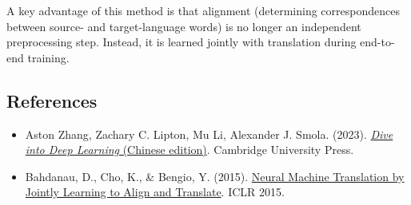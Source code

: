 A key advantage of this method is that alignment (determining correspondences between source- and target-language words) is no longer an independent preprocessing step. Instead, it is learned jointly with translation during end-to-end training.

\FloatBarrier
{}
\hypertarget{references-68}{%
\subsection{References}\label{references-68}}

\vspace{0.25em}
\begin{itemize}
\tightlist
\item
  Aston Zhang, Zachary C. Lipton, Mu Li, Alexander J. Smola. (2023). \href{https://zh.d2l.ai/}{\emph{Dive into Deep Learning} (Chinese edition)}. Cambridge University Press.
\item
  Bahdanau, D., Cho, K., \& Bengio, Y. (2015). \href{https://arxiv.org/abs/1409.0473}{Neural Machine Translation by Jointly Learning to Align and Translate}. ICLR 2015.
\end{itemize}

\clearpage
